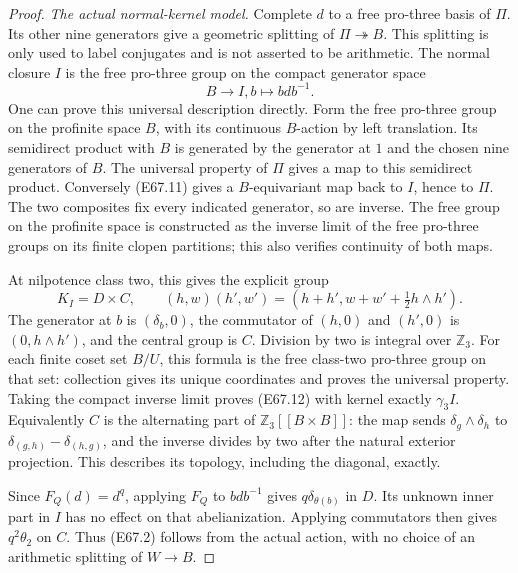 \begin{proof}
\emph{The actual normal-kernel model.}
Complete $d$ to a free pro-three basis of $\Pi$. Its other
nine generators give a geometric splitting of
$\Pi\twoheadrightarrow B$. This splitting is only used
to label conjugates and is not asserted to be arithmetic.
The normal closure $I$ is the free pro-three group on the
compact generator space
\[
                 B\longrightarrow I,
                    b\longmapsto bdb^{-1}.
 \tag{E67.11}
\]
One can prove this universal description directly. Form the
free pro-three group on the profinite space $B$, with its
continuous $B$-action by left translation. Its semidirect
product with $B$ is generated by the generator at $1$ and
the chosen nine generators of $B$. The universal property
of $\Pi$ gives a map to this semidirect product. Conversely
(E67.11) gives a $B$-equivariant map back to $I$, hence to
$\Pi$. The two composites fix every indicated generator,
so are inverse. The free group on the profinite space is
constructed as the inverse limit of the free pro-three
groups on its finite clopen partitions; this also verifies
continuity of both maps.

At nilpotence class two, this gives the explicit group
\[
 K_I=D\times C,\qquad
 (h,w)(h',w')=
     (h+h',w+w'+\tfrac12h\wedge h').
 \tag{E67.12}
\]
The generator at $b$ is $(\delta_b,0)$, the commutator
of $(h,0)$ and $(h',0)$ is $(0,h\wedge h')$, and the
central group is $C$. Division by two is integral over
$\mathbb Z_3$. For each finite coset set $B/U$, this
formula is the free class-two pro-three group on that
set: collection gives its unique coordinates and proves
the universal property. Taking the compact inverse limit
proves (E67.12) with kernel exactly $\gamma_3I$.
Equivalently $C$ is the alternating part of
$\mathbb Z_3[[B\times B]]$: the map sends
$\delta_g\wedge\delta_h$ to
$\delta_{(g,h)}-\delta_{(h,g)}$, and the inverse divides
by two after the natural exterior projection. This
describes its topology, including the diagonal, exactly.

Since $F_Q(d)=d^q$, applying $F_Q$ to $bdb^{-1}$
gives $q\delta_{\theta(b)}$ in $D$. Its unknown inner
part in $I$ has no effect on that abelianization. Applying
commutators then gives $q^2\theta_2$ on $C$. Thus
(E67.2) follows from the actual action, with no choice of
an arithmetic splitting of $W\to B$.


\end{proof}
